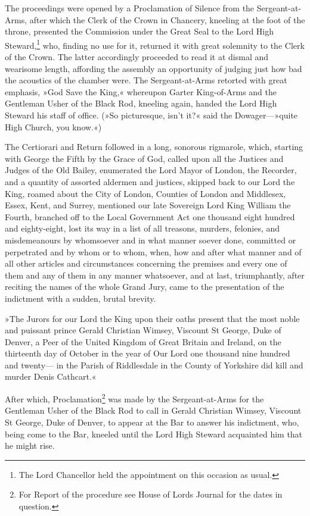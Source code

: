 The proceedings were opened by a Proclamation of Silence from the Sergeant-at-Arms, after which the Clerk of the Crown in Chancery, kneeling at the foot of the throne, presented the Commission under the Great Seal to the Lord High Steward,\footnote{The Lord Chancellor held the appointment on this occasion as usual.} who, finding no use for it, returned it with great solemnity to the Clerk of the Crown. The latter accordingly proceeded to read it at dismal and wearisome length, affording the assembly an opportunity of judging just how bad the acoustics of the chamber were. The Sergeant-at-Arms retorted with great emphasis, »God Save the King,« whereupon Garter King-of-Arms and the Gentleman Usher of the Black Rod, kneeling again, handed the Lord High Steward his staff of office. (»So picturesque, isn't it?« said the Dowager---»quite High Church, you know.«)

The Certiorari and Return followed in a long, sonorous rigmarole, which, starting with George the Fifth by the Grace of God, called upon all the Justices and Judges of the Old Bailey, enumerated the Lord Mayor of London, the Recorder, and a quantity of assorted aldermen and justices, skipped back to our Lord the King, roamed about the City of London, Counties of London and Middlesex, Essex, Kent, and Surrey, mentioned our late Sovereign Lord King William the Fourth, branched off to the Local Government Act one thousand eight hundred and eighty-eight, lost its way in a list of all treasons, murders, felonies, and misdemeanours by whomsoever and in what manner soever done, committed or perpetrated and by whom or to whom, when, how and after what manner and of all other articles and circumstances concerning the premises and every one of them and any of them in any manner whatsoever, and at last, triumphantly, after reciting the names of the whole Grand Jury, came to the presentation of the indictment with a sudden, brutal brevity.

»The Jurors for our Lord the King upon their oaths present that the most noble and puissant prince Gerald Christian Wimsey, Viscount St George, Duke of Denver, a Peer of the United Kingdom of Great Britain and Ireland, on the thirteenth day of October in the year of Our Lord one thousand nine hundred and twenty--- in the Parish of Riddlesdale in the County of Yorkshire did kill and murder Denis Cathcart.«

After which, Proclamation\footnote{For Report of the procedure see House of Lords Journal for the dates in question.} was made by the Sergeant-at-Arms for the Gentleman Usher of the Black Rod to call in Gerald Christian Wimsey, Viscount St George, Duke of Denver, to appear at the Bar to answer his indictment, who, being come to the Bar, kneeled until the Lord High Steward acquainted him that he might rise.

